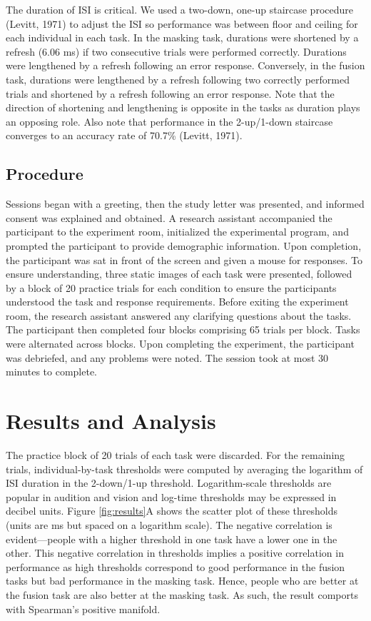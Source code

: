 \documentclass[
  ,man]{apa6}
\begin{document}
The duration of ISI is critical. We used a two-down, one-up staircase procedure (Levitt, 1971) to adjust the ISI so performance was between floor and ceiling for each individual in each task. In the masking task, durations were shortened by a refresh (6.06 ms) if two consecutive trials were performed correctly. Durations were lengthened by a refresh following an error response. Conversely, in the fusion task, durations were lengthened by a refresh following two correctly performed trials and shortened by a refresh following an error response. Note that the direction of shortening and lengthening is opposite in the tasks as duration plays an opposing role. Also note that performance in the 2-up/1-down staircase converges to an accuracy rate of 70.7\% (Levitt, 1971).

\hypertarget{procedure}{%
\subsection{Procedure}\label{procedure}}

Sessions began with a greeting, then the study letter was presented, and informed consent was explained and obtained. A research assistant accompanied the participant to the experiment room, initialized the experimental program, and prompted the participant to provide demographic information. Upon completion, the participant was sat in front of the screen and given a mouse for responses. To ensure understanding, three static images of each task were presented, followed by a block of 20 practice trials for each condition to ensure the participants understood the task and response requirements. Before exiting the experiment room, the research assistant answered any clarifying questions about the tasks. The participant then completed four blocks comprising 65 trials per block. Tasks were alternated across blocks. Upon completing the experiment, the participant was debriefed, and any problems were noted. The session took at most 30 minutes to complete.

\hypertarget{results-and-analysis}{%
\section{Results and Analysis}\label{results-and-analysis}}

The practice block of 20 trials of each task were discarded. For the remaining trials, individual-by-task thresholds were computed by averaging the logarithm of ISI duration in the 2-down/1-up threshold. Logarithm-scale thresholds are popular in audition and vision and log-time thresholds may be expressed in decibel units. Figure \ref{fig:results}A shows the scatter plot of these thresholds (units are ms but spaced on a logarithm scale). The negative correlation is evident---people with a higher threshold in one task have a lower one in the other. This negative correlation in thresholds implies a positive correlation in performance as high thresholds correspond to good performance in the fusion tasks but bad performance in the masking task. Hence, people who are better at the fusion task are also better at the masking task. As such, the result comports with Spearman's positive manifold.
\end{document}
